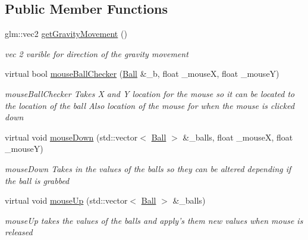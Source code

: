 \subsection*{Public Member Functions}
\begin{DoxyCompactItemize}
\item 
\hypertarget{classColorTransferControl_a446d087e090cb13cefdffb89e8c409e3}{
glm::vec2 \hyperlink{classColorTransferControl_a446d087e090cb13cefdffb89e8c409e3}{getGravityMovement} ()}
\label{classColorTransferControl_a446d087e090cb13cefdffb89e8c409e3}

\begin{DoxyCompactList}\small\item\em vec 2 varible for direction of the gravity movement \item\end{DoxyCompactList}\item 
virtual bool \hyperlink{classColorTransferControl_ab4db8c5f585065d55e4beaef3d51b940}{mouseBallChecker} (\hyperlink{structBall}{Ball} \&\_\-b, float \_\-mouseX, float \_\-mouseY)
\begin{DoxyCompactList}\small\item\em mouseBallChecker Takes X and Y location for the mouse so it can be located to the location of the ball Also location of the mouse for when the mouse is clicked down \item\end{DoxyCompactList}\item 
virtual void \hyperlink{classColorTransferControl_ac0acd46f1620035c8d7a830206fce6b8}{mouseDown} (std::vector$<$ \hyperlink{structBall}{Ball} $>$ \&\_\-balls, float \_\-mouseX, float \_\-mouseY)
\begin{DoxyCompactList}\small\item\em mouseDown Takes in the values of the balls so they can be altered depending if the ball is grabbed \item\end{DoxyCompactList}\item 
virtual void \hyperlink{classColorTransferControl_a335ef9511d0cacec325a154c106bb1da}{mouseUp} (std::vector$<$ \hyperlink{structBall}{Ball} $>$ \&\_\-balls)
\begin{DoxyCompactList}\small\item\em mouseUp takes the values of the balls and apply's them new values when mouse is released \item\end{DoxyCompactList}\item 

\end{DoxyCompactItemize}
